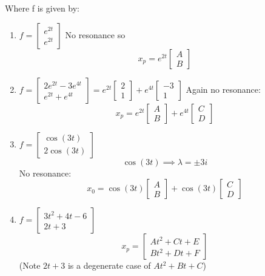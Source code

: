 \documentclass[12pt]{article}
\begin{document}
Where f is given by:
\begin{enumerate}
    \item $f = \begin{bmatrix}
        e^{2t}\\
        e^{2t}
    \end{bmatrix}$
    No resonance so 
    \[\boxed{x_p = e^{2t} \begin{bmatrix}
        A\\B
    \end{bmatrix}}\]

    \item $f = \begin{bmatrix}
        2e^{2t} - 3e^{4t}\\
        e^{2t} + e^{4t}
    \end{bmatrix} = e^{2t} \begin{bmatrix}
        2\\1
    \end{bmatrix} + e^{4t} \begin{bmatrix}
        -3\\1
    \end{bmatrix}$
    Again no resonance:
    \[\boxed{x_p = e^{2t} \begin{bmatrix}
        A\\B
    \end{bmatrix} + e^{4t} \begin{bmatrix}
        C\\D
    \end{bmatrix}}\]

    \item $f= \begin{bmatrix}
        \cos(3t)\\
        2\cos(3t)
    \end{bmatrix}$
    \[\cos(3t) \implies \lambda = \pm 3i\]
    No resonance:
    \[\boxed{x_0 = \cos(3t) \begin{bmatrix}
        A\\B
    \end{bmatrix}+ \cos(3t) \begin{bmatrix}
        C\\D
    \end{bmatrix}}\]

    \item $f = \begin{bmatrix}
        3t^2 + 4t - 6\\
        2t + 3
    \end{bmatrix}$
    \[\boxed{x_p = \begin{bmatrix}
        At^2 + Ct + E\\
        Bt^2 + Dt + F
    \end{bmatrix}}\]
    (Note $2t + 3$ is a degenerate case of $At^2 + Bt +C$)


\end{enumerate}
\end{document}
